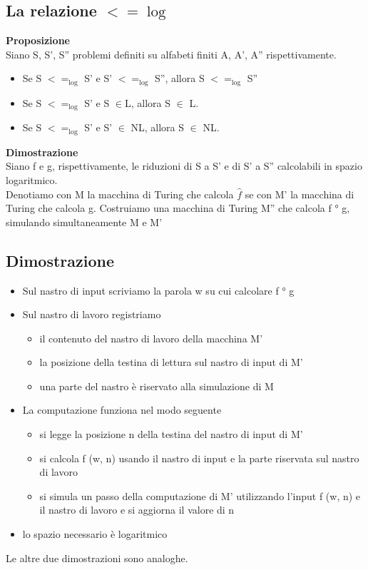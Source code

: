 \subsection{La relazione $<=\log$}
\textbf{Proposizione}\\
Siano S, S', S'' problemi definiti su alfabeti finiti A, A', A'' rispettivamente.
\begin{itemize}
    \item Se S $<=_{\log}$ S' e S' $<=_{\log}$ S'', allora S $<=_{\log}$  S''
    \item Se S $<=_{\log}$ S' e S $\in$L, allora S $\in$ L.
    \item Se S $<=_{\log}$ S' e S' $\in$ NL, allora S $\in$ NL.
\end{itemize}
\textbf{Dimostrazione}\\
Siano f e g, rispettivamente, le riduzioni di S a S' e di S' a S'' calcolabili in spazio logaritmico.
\\Denotiamo con M la macchina di Turing che calcola $\hat{f}$ se con M' la macchina di Turing che calcola g.
Costruiamo una macchina di Turing M'' che calcola f ° g, simulando simultaneamente M e M'
\subsection{Dimostrazione}
\begin{itemize}
    \item Sul nastro di input scriviamo la parola w su cui calcolare f ° g
    \item Sul nastro di lavoro registriamo
        \begin{itemize}
            \item il contenuto del nastro di lavoro della macchina M'
            \item la posizione della testina di lettura sul nastro di input di M'
            \item una parte del nastro è riservato alla simulazione di M
        \end{itemize}
    \item La computazione funziona nel modo seguente
    \begin{itemize}
        \item si legge la posizione n della testina del nastro di input di M'
        \item  si calcola f (w, n) usando il nastro di input e la parte riservata sul nastro di lavoro
        \item  si simula un passo della computazione di M' utilizzando l’input f (w, n) e il nastro di lavoro e si aggiorna il valore di n
    \end{itemize}
    \item lo spazio necessario è logaritmico
\end{itemize}
Le altre due dimostrazioni sono analoghe.
\newpage
